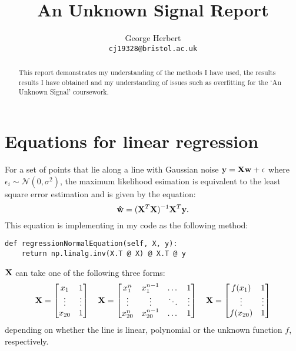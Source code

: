 \documentclass[onecolumn, 12t, a4paper]{article}
\author{
  George Herbert\\
  \texttt{cj19328@bristol.ac.uk}
}
\title{An Unknown Signal Report}
\begin{document}
\maketitle

\begin{abstract}
    This report demonstrates my understanding of the methods I have 
    used, the results results I have obtained and my understanding
    of issues such as overfitting for the `An Unknown Signal'
    coursework.
\end{abstract}

\section{Equations for linear regression}

For a set of points that lie along a line with Gaussian noise 
$\vb{y} = \vb{X}\vb{w} + \vb{\epsilon}$ where $\epsilon_{i} \sim \mathcal{N}(0, \sigma^{2})$,
the maximum likelihood esimation is equivalent to the least square 
error estimation and is given by the equation:
\[
    \vb{\hat{w}} = (\vb{X}^{T}\vb{X})^{-1}\vb{X}^{T}\vb{y}.
\]
This equation is implementing in my code as the following
method:
\begin{verbatim}
def regressionNormalEquation(self, X, y):
    return np.linalg.inv(X.T @ X) @ X.T @ y
\end{verbatim}

$\vb{X}$ can take one of the following
three forms:
\[
\vb{X} =
\begin{bmatrix}
    x_{1} & 1 \\
    \vdots & \vdots \\
    x_{20} & 1 \\
\end{bmatrix}
\quad
\vb{X} =
\begin{bmatrix}
    x_{1}^{n} & x_{1}^{n-1} & \dots & 1 \\
    \vdots & \vdots & \ddots & \vdots \\
    x_{20}^{n} & x_{20}^{n-1} & \dots & 1 \\
\end{bmatrix}
\quad
\vb{X} =
\begin{bmatrix}
    f(x_{1}) & 1 \\
    \vdots & \vdots \\
    f(x_{20}) & 1 \\
\end{bmatrix}
\]
depending on whether the line is linear, polynomial or
the unknown function $f$, respectively.
\end{document}
